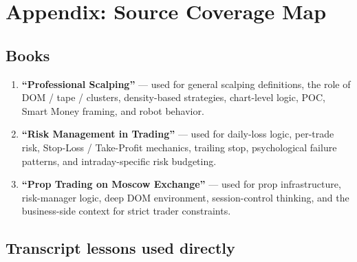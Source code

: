 \section{Appendix: Source Coverage Map}

\subsection{Books}

\begin{enumerate}[leftmargin=1.5em]
\item \textbf{``Professional Scalping''} --- used for general scalping definitions, the role of DOM / tape / clusters, density-based strategies, chart-level logic, POC, Smart Money framing, and robot behavior.
\item \textbf{``Risk Management in Trading''} --- used for daily-loss logic, per-trade risk, Stop-Loss / Take-Profit mechanics, trailing stop, psychological failure patterns, and intraday-specific risk budgeting.
\item \textbf{``Prop Trading on Moscow Exchange''} --- used for prop infrastructure, risk-manager logic, deep DOM environment, session-control thinking, and the business-side context for strict trader constraints.
\end{enumerate}

\subsection{Transcript lessons used directly}

